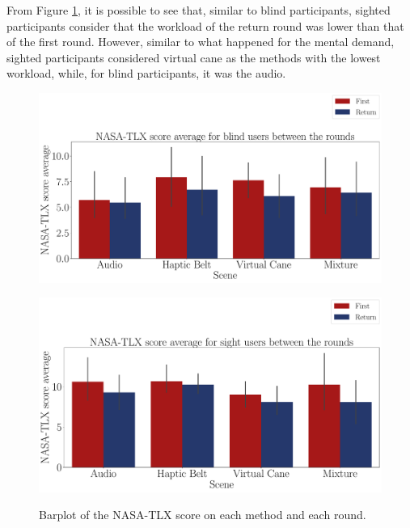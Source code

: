 

From Figure \ref{fig:barplot_nasa_avg_4_scene}, it is possible to see that, similar to blind participants, sighted participants consider that the workload of the return round was lower than that of the first round. However, similar to what happened for the mental demand, sighted participants considered virtual cane as the methods with the lowest workload, while, for  blind participants, it was the audio.

\begin{figure}[!htb]
    \centering
    \begin{minipage}{\textwidth}
        \centering
        \includegraphics[width = \textwidth]{Resultados/Nasa/Figuras/pdf/barplot_nasa_avg_4_scene_blind.pdf}
        \label{fig:barplot_nasa_avg_4_scene_blind}
    \end{minipage}
    \begin{minipage}{\textwidth}
        \centering
        \includegraphics[width = \textwidth]{Resultados/Nasa/Figuras/pdf/barplot_nasa_avg_4_scene_sight.pdf}
        \label{fig:barplot_nasa_avg_4_scene_sight}
    \end{minipage}
    \caption{Barplot of the NASA-TLX score on each method and each round.}
    \label{fig:barplot_nasa_avg_4_scene}
\end{figure}

